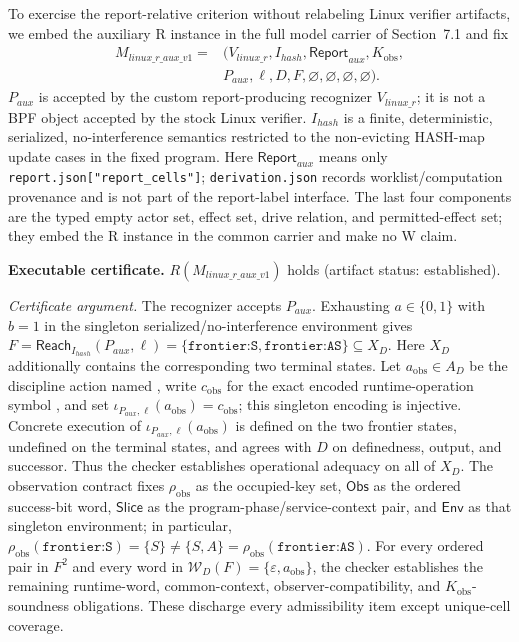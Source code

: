 \documentclass[conference]{IEEEtran}
\begin{document}
To exercise the report-relative criterion without relabeling Linux verifier artifacts, we embed the auxiliary R instance in the full model carrier of Section~7.1 and fix
\begin{equation}
\begin{aligned}
M_{\mathit{linux\_r\_aux\_v1}}={}&(V_{\mathit{linux\_r}},I_{\mathit{hash}},\mathsf{Report}_{\mathit{aux}},K_{\mathrm{obs}},\\
&P_{\mathit{aux}},\ell,D,F,\varnothing,\varnothing,\varnothing,\varnothing).
\end{aligned}
\end{equation}
$P_{\mathit{aux}}$ is accepted by the custom report-producing recognizer $V_{\mathit{linux\_r}}$; it is not a BPF object accepted by the stock Linux verifier. $I_{\mathit{hash}}$ is a finite, deterministic, serialized, no-interference semantics restricted to the non-evicting HASH-map update cases in the fixed program. Here $\mathsf{Report}_{\mathit{aux}}$ means only \texttt{report.json["report\_cells"]}; \texttt{derivation.json} records worklist/computation provenance and is not part of the report-label interface. The last four components are the typed empty actor set, effect set, drive relation, and permitted-effect set; they embed the R instance in the common carrier and make no W claim.

\noindent\textbf{Executable certificate.} $R(M_{\mathit{linux\_r\_aux\_v1}})$ holds (artifact status: established).

\emph{Certificate argument.} The recognizer accepts $P_{\mathit{aux}}$. Exhausting $a\in\{0,1\}$ with $b=1$ in the singleton serialized/no-interference environment gives $F=\mathsf{Reach}_{I_{\mathit{hash}}}(P_{\mathit{aux}},\ell)=\{\texttt{frontier:S},\texttt{frontier:AS}\}\subseteq X_D$. Here $X_D$ additionally contains the corresponding two terminal states. Let $a_{\mathrm{obs}}\in A_D$ be the discipline action named , write $c_{\mathrm{obs}}$ for the exact encoded runtime-operation symbol , and set $\iota_{P_{\mathit{aux}},\ell}(a_{\mathrm{obs}})=c_{\mathrm{obs}}$; this singleton encoding is injective. Concrete execution of $\iota_{P_{\mathit{aux}},\ell}(a_{\mathrm{obs}})$ is defined on the two frontier states, undefined on the terminal states, and agrees with $D$ on definedness, output, and successor. Thus the checker establishes operational adequacy on all of $X_D$. The observation contract fixes $\rho_{\mathrm{obs}}$ as the occupied-key set, $\mathsf{Obs}$ as the ordered success-bit word, $\mathsf{Slice}$ as the program-phase/service-context pair, and $\mathsf{Env}$ as that singleton environment; in particular, $\rho_{\mathrm{obs}}(\texttt{frontier:S})=\{S\}\ne\{S,A\}=\rho_{\mathrm{obs}}(\texttt{frontier:AS})$. For every ordered pair in $F^2$ and every word in $\mathcal W_D(F)=\{\varepsilon,a_{\mathrm{obs}}\}$, the checker establishes the remaining runtime-word, common-context, observer-compatibility, and $K_{\mathrm{obs}}$-soundness obligations. These discharge every admissibility item except unique-cell coverage.
\end{document}
